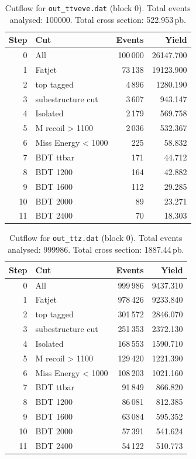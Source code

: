 \documentclass{article}
\begin{document}
\begin{table}[H]
\centering
\begin{tabular}{r l r r}
\toprule
Step & Cut & Events & Yield \\
\midrule
0 & All & 100\,000 & 26147.700 \\
1 & Fatjet & 73\,138 & 19123.900 \\
2 & top tagged & 4\,896 & 1280.190 \\
3 & subestructure cut & 3\,607 & 943.147 \\
4 & Isolated & 2\,179 & 569.758 \\
5 & M recoil > 1100 & 2\,036 & 532.367 \\
6 & Miss Energy < 1000 & 225 & 58.832 \\
7 & BDT ttbar & 171 & 44.712 \\
8 & BDT 1200 & 164 & 42.882 \\
9 & BDT 1600 & 112 & 29.285 \\
10 & BDT 2000 & 89 & 23.271 \\
11 & BDT 2400 & 70 & 18.303 \\
\bottomrule
\end{tabular}
\caption{Cutflow for \texttt{out\_ttveve.dat} (block 0). Total events analysed: 100000. Total cross section: 522.953\,pb.}
\label{tab:cutflow-out-ttveve-dat}
\end{table}

\begin{table}[H]
\centering
\begin{tabular}{r l r r}
\toprule
Step & Cut & Events & Yield \\
\midrule
0 & All & 999\,986 & 9437.310 \\
1 & Fatjet & 978\,426 & 9233.840 \\
2 & top tagged & 301\,572 & 2846.070 \\
3 & subestructure cut & 251\,353 & 2372.130 \\
4 & Isolated & 168\,553 & 1590.710 \\
5 & M recoil > 1100 & 129\,420 & 1221.390 \\
6 & Miss Energy < 1000 & 108\,203 & 1021.160 \\
7 & BDT ttbar & 91\,849 & 866.820 \\
8 & BDT 1200 & 86\,081 & 812.385 \\
9 & BDT 1600 & 63\,084 & 595.352 \\
10 & BDT 2000 & 57\,391 & 541.624 \\
11 & BDT 2400 & 54\,122 & 510.773 \\
\bottomrule
\end{tabular}
\caption{Cutflow for \texttt{out\_ttz.dat} (block 0). Total events analysed: 999986. Total cross section: 1887.44\,pb.}
\label{tab:cutflow-out-ttz-dat}
\end{table}
\end{document}

